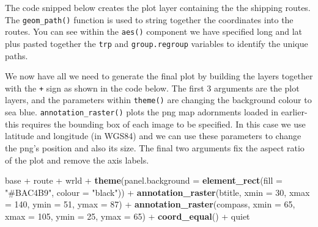 \documentclass[]{article}
\newenvironment{Shaded}{}{}
\newcommand{\KeywordTok}[1]{\textcolor[rgb]{0.00,0.44,0.13}{\textbf{{#1}}}}
\newcommand{\DataTypeTok}[1]{\textcolor[rgb]{0.56,0.13,0.00}{{#1}}}
\newcommand{\DecValTok}[1]{\textcolor[rgb]{0.25,0.63,0.44}{{#1}}}
\newcommand{\FloatTok}[1]{\textcolor[rgb]{0.25,0.63,0.44}{{#1}}}
\newcommand{\StringTok}[1]{\textcolor[rgb]{0.25,0.44,0.63}{{#1}}}
\newcommand{\NormalTok}[1]{{#1}}
\begin{document}
The code snipped below creates the plot layer containing the the
shipping routes. The \texttt{geom\_path()} function is used to string
together the coordinates into the routes. You can see within the
\texttt{aes()} component we have specified long and lat plus pasted
together the \texttt{trp} and \texttt{group.regroup} variables to
identify the unique paths.

\begin{Shaded}
\end{Shaded}

We now have all we need to generate the final plot by building the
layers together with the \texttt{+} sign as shown in the code below. The
first 3 arguments are the plot layers, and the parameters within
\texttt{theme()} are changing the background colour to sea blue.
\texttt{annotation\_raster()} plots the png map adornments loaded in
earlier- this requires the bounding box of each image to be specified.
In this case we use latitude and longitude (in WGS84) and we can use
these parameters to change the png's position and also its size. The
final two arguments fix the aspect ratio of the plot and remove the axis
labels.

\begin{Shaded}
\begin{Highlighting}[]
\NormalTok{base +}\StringTok{ }\NormalTok{route +}\StringTok{ }\NormalTok{wrld +}\StringTok{ }\KeywordTok{theme}\NormalTok{(}\DataTypeTok{panel.background =} \KeywordTok{element_rect}\NormalTok{(}\DataTypeTok{fill =} \StringTok{"#BAC4B9"}\NormalTok{, }
    \DataTypeTok{colour =} \StringTok{"black"}\NormalTok{)) +}\StringTok{ }\KeywordTok{annotation_raster}\NormalTok{(btitle, }\DataTypeTok{xmin =} \DecValTok{30}\NormalTok{, }\DataTypeTok{xmax =} \DecValTok{140}\NormalTok{, }\DataTypeTok{ymin =} \DecValTok{51}\NormalTok{, }
    \DataTypeTok{ymax =} \DecValTok{87}\NormalTok{) +}\StringTok{ }\KeywordTok{annotation_raster}\NormalTok{(compass, }\DataTypeTok{xmin =} \DecValTok{65}\NormalTok{, }\DataTypeTok{xmax =} \DecValTok{105}\NormalTok{, }\DataTypeTok{ymin =} \DecValTok{25}\NormalTok{, }
    \DataTypeTok{ymax =} \DecValTok{65}\NormalTok{) +}\StringTok{ }\KeywordTok{coord_equal}\NormalTok{() +}\StringTok{ }\NormalTok{quiet}
\end{Highlighting}
\end{Shaded}
\end{document}

